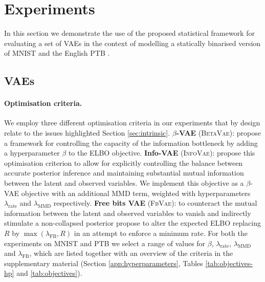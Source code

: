 \section{Experiments}\label{sec:experiments}

In this section we  demonstrate the use of the proposed statistical framework for evaluating a set of VAEs in the context of modelling a statically binarised version of MNIST \citep{deng2012mnist} and the English PTB \citep{marcus1993ptb}.



\subsection{VAEs}


\paragraph{Optimisation criteria.} We employ three different optimisation criteria in our experiments that by design relate to the issues highlighted Section \ref{sec:intrinsic}. 
\textbf{$\beta$-VAE} (\textsc{BetaVae}): \citet{higgins2016beta} propose a framework for controlling the capacity of the information bottleneck by adding a hyperparameter $\beta$ to the ELBO objective. \textbf{Info-VAE} (\textsc{InfoVae}): \citet{zhao2017infovae} propose this optimisation criterion to allow for explicitly controlling the balance between accurate posterior inference and maintaining substantial mutual information between the latent and observed variables. We implement this objective as a $\beta$-VAE objective with an additional MMD term, weighted with hyperparameters $\lambda_\text{rate}$ and $\lambda_{\text{MMD}}$ respectively. \textbf{Free bits VAE} (\textsc{FbVae}): to counteract the mutual information between the latent and observed variables to vanish and indirectly stimulate a non-collapsed posterior \citet{kingma2016improved} propose to alter the expected ELBO replacing $R$ by $\max(\lambda_\text{FB}, R)$ in an attempt to enforce a minimum rate.
For both the experiments on MNIST and PTB we select a range of values for $\beta$, $\lambda_\text{rate}$, $\lambda_{\text{MMD}}$ and $\lambda_\text{FB}$, which are listed together with an overview of the criteria in the supplementary material (Section \ref{app:hyperparameters}, Tables \ref{tab:objectives-hp} and \ref{tab:objectives}).

